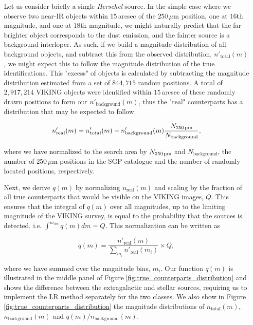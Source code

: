 Let us consider briefly a single \textit{Herschel} source. In the simple case where we observe two near-IR objects within $15\,$arcsec of the $250\,\mu$m position, one at $16$th magnitude, and one at $18$th magnitude, we might naturally predict that the far brighter object corresponds to the dust emission, and the fainter source is a background interloper. As such, if we build a magnitude distribution of all background objects, and subtract this from the observed distribution, $n'_{\textrm{total}}(m)$, we might expect this to follow the magnitude distribution of the true identifications. This "excess" of objects is calculated by subtracting the magnitude distribution estimated from a set of $844,715$ random positions. A total of $2,917,214$ VIKING objects were identified within $15\,$arcsec of these randomly drawn positions to form our $n'_{\textrm{background}}(m)$, thus the "real" counterparts has a distribution that may be expected to follow

\begin{equation}
    n'_{\textrm{real}}(m) = n'_{\textrm{total}}(m) - n'_{\textrm{background}}(m) \frac{N_{\textrm{250\,\micron}}}{N_{\textrm{background}}},
\label{eq:real_distribution}
\end{equation}

\noindent where we have normalized to the search area by $N_{\textrm{250\,\micron}}$ and $N_{\textrm{background}}$, the number of $250\,\mu$m positions in the SGP catalogue and the number of randomly located positions, respectively.

Next, we derive $q(m)$ by normalizing $n_{\textrm{real}}(m)$ and scaling by the fraction of all true counterparts that would be visible on the VIKING images, $Q$. This ensures that the integral of $q(m)$ over all magnitudes, up to the limiting magnitude of the VIKING survey, is equal to the probability that the sources is detected, i.e. $\int^{m_{\textrm{lim}}} q(m)dm = Q$. This normalization can be written as

\begin{equation}
\label{eq:true_counterparts_distribution}
    q(m) = \frac{n'_{\textrm{real}}(m)}{\sum_{m_i}n'_{\textrm{real}}(m_i)}\times Q,
\end{equation}

\noindent where we have summed over the magnitude bins, $m_i$. Our function $q(m)$ is illustrated in the middle panel of Figure \ref{fig:true_counterparts_distribution} and shows the difference between the extragalactic and stellar sources, requiring us to implement the LR method separately for the two classes. We also show in Figure \ref{fig:true_counterparts_distribution} the magnitude distributions of $n_{\textrm{total}}(m)$, $n_{\textrm{background}}(m)$ and $q(m)/n_{\textrm{background}}(m)$. 

